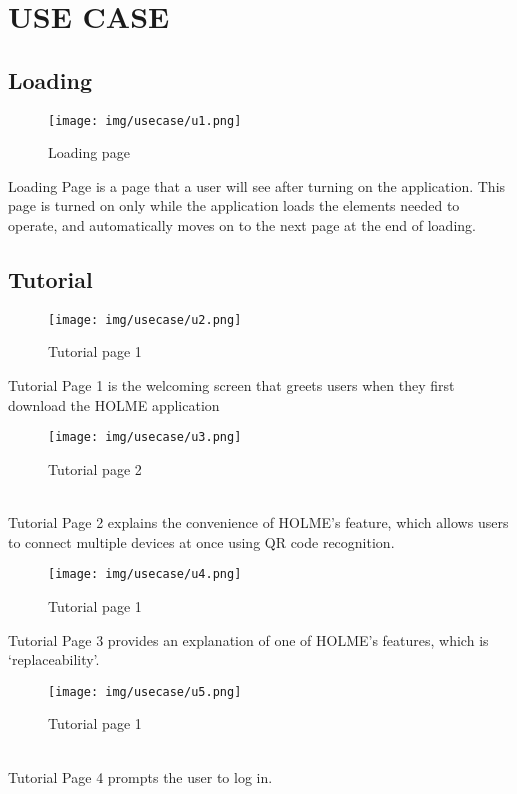 \documentclass[conference]{IEEEtran}
\begin{document}
\section{USE CASE}
\subsection{Loading}
\begin{figure}[h]
\centering
\texttt{[image: img/usecase/u1.png]}
\caption{Loading page}
\end{figure}
Loading Page is a page that a user will see after
turning on the application. This page is turned on only while
the application loads the elements needed to operate, and
automatically moves on to the next page at the end of loading.
\vspace{2cm}

\subsection{Tutorial}
\begin{figure}[h]
\centering
\texttt{[image: img/usecase/u2.png]}
\caption{Tutorial page 1}
\end{figure}
Tutorial Page 1 is the welcoming screen that greets users when they first download the HOLME application\\
\vspace{2cm}
\begin{figure}[h]
\centering
\texttt{[image: img/usecase/u3.png]}
\caption{Tutorial page 2}
\end{figure}
\\
Tutorial Page 2 explains the convenience of HOLME's feature, which allows users to connect multiple devices at once using QR code recognition.
\clearpage
\begin{figure}[h]
\centering
\texttt{[image: img/usecase/u4.png]}
\caption{Tutorial page 1}
\end{figure}
Tutorial Page 3 provides an explanation of one of HOLME's features, which is `replaceability'.\\
\vspace{2cm}
\begin{figure}[h]
\centering
\texttt{[image: img/usecase/u5.png]}
\caption{Tutorial page 1}
\end{figure}
\\
Tutorial Page 4 prompts the user to log in.\\\\\\\\\\\\
\end{document}
